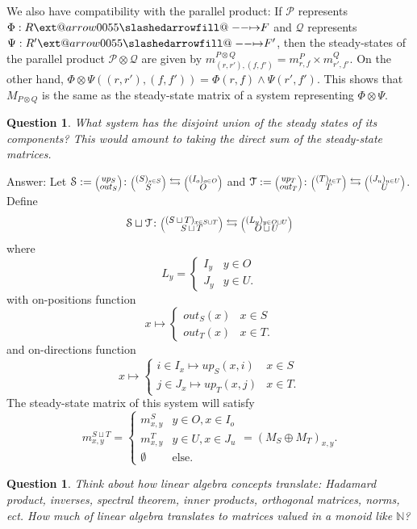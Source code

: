 \documentclass[12pt, a4paper]{article}
\makeatletter
\theoremstyle{definition}
\theoremstyle{plain}
\theoremstyle{plain}
\theoremstyle{plain}
\theoremstyle{plain}
\newtheorem{question}[counter]{Question}
\theoremstyle{plain}
\theoremstyle{remark}
\theoremstyle{remark}
\newcommand{\mc}[1]{\mathcal{#1}}
\newcommand{\lens}[2]{\scaleobj{0.6}{\begin{pmatrix} \scaleobj{1.3}{{#1}} \\ \scaleobj{1.3}{{#2}} \end{pmatrix}}}
\def\slashedarrowfill@#1#2#3#4#5{%
	$\m@th\thickmuskip0mu\medmuskip\thickmuskip\thinmuskip\thickmuskip
	\relax#5#1\mkern-7mu%
	\cleaders\hbox{$#5\mkern-2mu#2\mkern-2mu$}\hfill
	\mathclap{#3}\mathclap{#2}%
	\cleaders\hbox{$#5\mkern-2mu#2\mkern-2mu$}\hfill
	\mkern-7mu#4$%
}
\def\rightslashedarrowfill@{%
	\slashedarrowfill@\relbar\relbar\mapstochar\rightarrow}
\newcommand\xslashedrightarrow[2][]{%
	\ext@arrow 0055{\rightslashedarrowfill@}{#1}{#2}}
\newcommand{\prof}{\xslashedrightarrow{}}
\makeatother
\begin{document}
We also have compatibility with the parallel product: If $\mc{P}$ represents $\Phi: R \prof F$ and $\mc{Q}$ represents $\Psi: R' \prof F'$, then the steady-states of the parallel product $\mc{P} \otimes \mc{Q}$ are given by $m^{P \otimes Q}_{(r,r'),(f,f')} = m^P_{r,f} \times m^Q_{r',f'}$. On the other hand, $\Phi \otimes \Psi ((r,r'),(f,f')) = \Phi(r,f) \wedge \Psi(r',f')$. This shows that $M_{P \otimes Q}$ is the same as the steady-state matrix of a system representing $\Phi \otimes \Psi$.

\begin{question}
	What system has the disjoint union of the steady states of its components? This would amount to taking the direct sum of the steady-state matrices.
\end{question}

Answer: Let $\mc{S} := \lens{up_S}{out_S} \colon \lens{(S)_{s \in S}}{S} \leftrightarrows \lens{(I_o)_{o \in O}}{O}$ and $\mc{T} := \lens{up_T}{out_T} \colon \lens{(T)_{t \in T}}{T} \leftrightarrows \lens{(J_u)_{u \in U}}{U}$. Define 
$$\mc{S} \sqcup \mc{T} \colon \lens{(S \sqcup T)_{x \in S \sqcup T}}{S \sqcup T} \leftrightarrows \lens{(L_y)_{y \in O \sqcup U}}{O \sqcup U}$$ 
where 
$$L_y = \begin{cases} I_y & y \in O \\ J_y & y \in U. \end{cases}$$
with on-positions function 
$$x \mapsto \begin{cases} out_S(x) & x \in S \\ out_T(x) & x \in T. \end{cases}$$ 
and on-directions function 
$$ x \mapsto \begin{cases} i \in I_x \mapsto up_S(x,i) & x \in S \\ j \in J_x \mapsto up_T(x,j) & x \in T. \end{cases}$$
The steady-state matrix of this system will satisfy 
$$m^{S \sqcup T}_{x,y} = \begin{cases} m^S_{x,y} & y \in O, x \in I_o \\  m^T_{x,y} & y \in U, x \in J_u \\ \emptyset & \text{else.} \end{cases} = (M_S \oplus M_T)_{x,y}.$$

\begin{question}
	Think about how linear algebra concepts translate: Hadamard product, inverses, spectral theorem, inner products, orthogonal matrices, norms, ect. How much of linear algebra translates to matrices valued in a monoid like $\mathbb{N}$?
\end{question}
\end{document}
